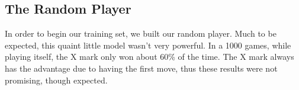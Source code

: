 
\subsection{The Random Player}
In order to begin our training set, we built our random player.
Much to be expected, this quaint little model wasn't very powerful.
In a 1000 games, while playing itself, the X mark only won about 60\% of the time.
The X mark always has the advantage due to having the first move, thus these results were not promising, though expected.
